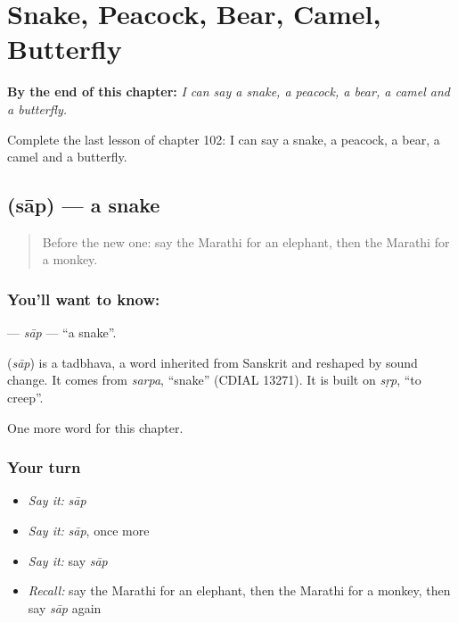 
\chapter{Snake, Peacock, Bear, Camel, Butterfly}
\label{ch:mr-snake-peacock-bear-camel-butterfly}

\begin{chapteropening}
\textbf{By the end of this chapter:} \emph{I can say a snake, a peacock, a bear, a camel and a butterfly.}

Complete the last lesson of chapter 102: I can say a snake, a peacock, a bear, a camel and a butterfly.
\end{chapteropening}

\section[\texorpdfstring{\mr{साप} (sāp)}{साप (sāp)}]{ (sāp) — a snake}

\label{lesson:MR-C102-sap}



\begin{quote}
Before the new one: say the Marathi for an elephant, then the Marathi for a monkey.
\end{quote}

\subsection*{You'll want to know: }
\textbf{} — \emph{sāp} — \textquotedblleft{}a snake\textquotedblright{}.

\begin{cousinweb}
\textbf{} (\emph{sāp}) is a tadbhava, a word inherited from Sanskrit and reshaped by sound change. It comes from \emph{sarpa}, \textquotedblleft{}snake\textquotedblright{} (CDIAL 13271). It is built on \emph{sṛp}, \textquotedblleft{}to creep\textquotedblright{}.
\end{cousinweb}

\begin{grammarlens}[title={What you've built}]
One more word for this chapter.
\end{grammarlens}

\subsection*{Your turn}
\begin{itemize}
\raggedright
  \item \emph{Say it:} \emph{sāp}
  \item \emph{Say it:} \emph{sāp}, once more
  \item \emph{Say it:} say \emph{sāp}
  \item \emph{Recall:} say the Marathi for an elephant, then the Marathi for a monkey, then say \emph{sāp} again
\end{itemize}

